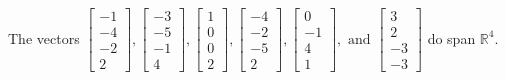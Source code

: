 \begin{exercise}
\begin{exerciseStatement}
  \end{exerciseStatement}
  \begin{exerciseAnswer}
   The vectors \(\left[\begin{array}{r}
-1 \\
-4 \\
-2 \\
2
\end{array}\right] , \left[\begin{array}{r}
-3 \\
-5 \\
-1 \\
4
\end{array}\right] , \left[\begin{array}{r}
1 \\
0 \\
0 \\
2
\end{array}\right] , \left[\begin{array}{r}
-4 \\
-2 \\
-5 \\
2
\end{array}\right] , \left[\begin{array}{r}
0 \\
-1 \\
4 \\
1
\end{array}\right] , \text{ and } \left[\begin{array}{r}
3 \\
2 \\
-3 \\
-3
\end{array}\right]\) 
  	 do  
	span \(\mathbb{R}^4\).
  


  \end{exerciseAnswer}
\end{exercise}